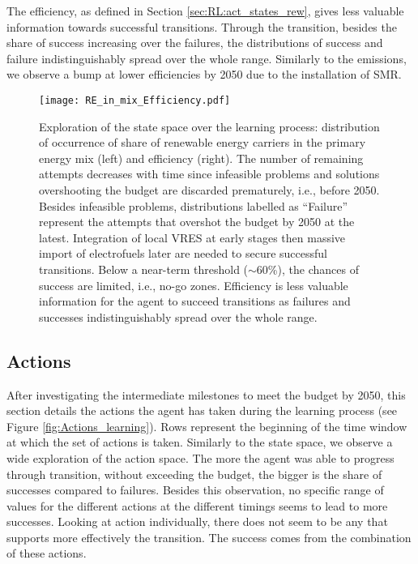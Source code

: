 \documentclass[11pt,twoside,a4paper,english]{article}
\def\ie{i.e., }
\begin{document}
The efficiency, as defined in Section \ref{sec:RL:act_states_rew}, gives less valuable information towards successful transitions. Through the transition, besides the share of success increasing over the failures, the distributions of success and failure indistinguishably spread over the whole range. Similarly to the emissions, we observe a bump at lower efficiencies by 2050 due to the installation of \gls{SMR}.

\begin{figure}[!htbp]
\centering
\texttt{[image: RE\_in\_mix\_Efficiency.pdf]}
\caption{Exploration of the state space over the learning process: distribution of occurrence of share of renewable energy carriers in the primary energy mix (left) and efficiency (right).  The number of remaining attempts decreases with time since infeasible problems and solutions overshooting the  budget are discarded prematurely, \ie before 2050. Besides infeasible problems, distributions labelled as ``Failure'' represent the attempts that overshot the  budget by 2050 at the latest. Integration of local \gls{VRES} at early stages then massive import of electrofuels later are needed to secure successful transitions. Below a near-term threshold ($\sim$60\%), the chances of success are limited, \ie no-go zones. Efficiency is less valuable information for the agent to succeed transitions as failures and successes indistinguishably spread over the whole range.}
\label{fig:RE_in_mix_Efficiency}
\end{figure}

\subsection{Actions}
\label{subsec:RL:learning:actions}

After investigating the intermediate milestones to meet the  budget by 2050, this section details the actions the agent has taken during the learning process (see Figure \ref{fig:Actions_learning}). Rows represent the beginning of the time window at which the set of actions is taken. Similarly to the state space, we observe a wide exploration of the action space. The more the agent was able to progress through transition, without exceeding the  budget, the bigger is the share of successes compared to failures. Besides this observation, no specific range of values for the different actions at the different timings seems to lead to more successes. Looking at action individually, there does not seem to be any that supports more effectively the transition. The success comes from the combination of these actions. 
\end{document}

